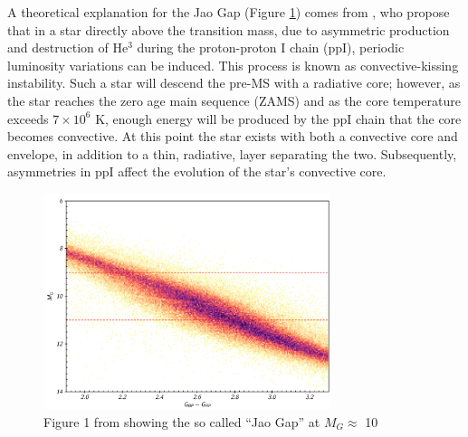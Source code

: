%
A theoretical explanation for the Jao Gap (Figure \ref{fig:JaoGap}) comes from
\citet{van2012}, who propose that in a star directly above the transition mass,
due to asymmetric production and destruction of He$^{3}$ during the
proton-proton I chain (ppI), periodic luminosity variations can be induced.
This process is known as convective-kissing instability. Such a star will
descend the pre-MS with a radiative core; however, as the star reaches the zero
age main sequence (ZAMS) and as the core temperature exceeds $7\times 10^{6}$
K, enough energy will be produced by the ppI chain that the core becomes
convective. At this point the star exists with both a convective core and
envelope, in addition to a thin, radiative, layer separating the two.
Subsequently, asymmetries in ppI affect the evolution of the star's convective
core.

\begin{figure}
	\centering
	\includegraphics[width=0.75\textwidth]{src/Figures/JaoGap.png}
	\caption{Figure 1 from \citet{Jao2018} showing the so called ``Jao Gap'' at
	$M_{G}\approx$ 10}
	\label{fig:JaoGap}
\end{figure}

